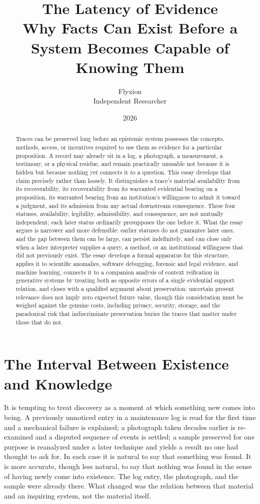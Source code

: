 \documentclass[11pt]{article}
\title{The Latency of Evidence \\ \large Why Facts Can Exist Before a System Becomes Capable of Knowing Them}
\author{Flyxion \\ \small Independent Researcher}
\date{2026}
\begin{document}
\maketitle

\begin{abstract}
Traces can be preserved long before an epistemic system possesses the concepts, methods, access, or incentives required to use them as evidence for a particular proposition. A record may already sit in a log, a photograph, a measurement, a testimony, or a physical residue, and remain practically unusable not because it is hidden but because nothing yet connects it to a question. This essay develops that claim precisely rather than loosely. It distinguishes a trace's material availability from its recoverability, its recoverability from its warranted evidential bearing on a proposition, its warranted bearing from an institution's willingness to admit it toward a judgment, and its admission from any actual downstream consequence. These four statuses, availability, legibility, admissibility, and consequence, are not mutually independent; each later status ordinarily presupposes the one before it. What the essay argues is narrower and more defensible: earlier statuses do not guarantee later ones, and the gap between them can be large, can persist indefinitely, and can close only when a later interpreter supplies a query, a method, or an institutional willingness that did not previously exist. The essay develops a formal apparatus for this structure, applies it to scientific anomalies, software debugging, forensic and legal evidence, and machine learning, connects it to a companion analysis of context reification in generative systems by treating both as opposite errors of a single evidential support relation, and closes with a qualified argument about preservation: uncertain present relevance does not imply zero expected future value, though this consideration must be weighed against the genuine costs, including privacy, security, storage, and the paradoxical risk that indiscriminate preservation buries the traces that matter under those that do not.
\end{abstract}

\section{The Interval Between Existence and Knowledge}

It is tempting to treat discovery as a moment at which something new comes into being. A previously unnoticed entry in a maintenance log is read for the first time and a mechanical failure is explained; a photograph taken decades earlier is re-examined and a disputed sequence of events is settled; a sample preserved for one purpose is reanalyzed under a later technique and yields a result no one had thought to ask for. In each case it is natural to say that something was found. It is more accurate, though less natural, to say that nothing was found in the sense of having newly come into existence. The log entry, the photograph, and the sample were already there. What changed was the relation between that material and an inquiring system, not the material itself.
\end{document}
